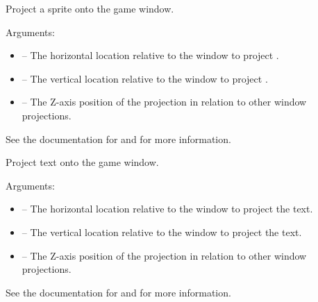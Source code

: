 \documentclass[letterpaper,10pt,english]{sphinxmanual}
\begin{document}

\begin{fulllineitems}
\label{dsp:sge.dsp.Game.project_sprite}
Project a sprite onto the game window.

Arguments:
\begin{itemize}
\item {} 
 -- The horizontal location relative to the window to
project .

\item {} 
 -- The vertical location relative to the window to
project .

\item {} 
 -- The Z-axis position of the projection in relation to
other window projections.

\end{itemize}

See the documentation for {\hyperref[gfx:sge.gfx.Sprite.draw_sprite]{\emph{}}} and
{\hyperref[dsp:sge.dsp.Game.project_dot]{\emph{}}} for more information.

\end{fulllineitems}


\begin{fulllineitems}
\label{dsp:sge.dsp.Game.project_text}
Project text onto the game window.

Arguments:
\begin{itemize}
\item {} 
 -- The horizontal location relative to the window to
project the text.

\item {} 
 -- The vertical location relative to the window to
project the text.

\item {} 
 -- The Z-axis position of the projection in relation to
other window projections.

\end{itemize}

See the documentation for {\hyperref[gfx:sge.gfx.Sprite.draw_text]{\emph{}}} and
{\hyperref[dsp:sge.dsp.Game.project_dot]{\emph{}}} for more information.

\end{fulllineitems}
\end{document}
